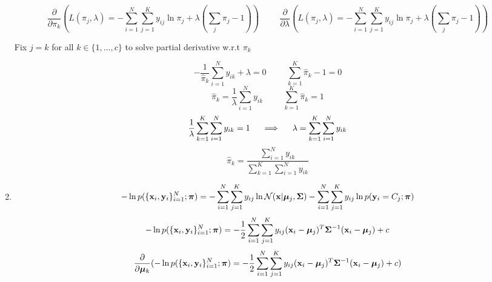 \documentclass[submit]{harvardml}
\begin{document}
\begin{enumerate}
        \begin{equation*}
           \frac{\partial}{\partial\pi_{k}}(L(\pi_{j}, \lambda) = -\sum_{i=1}^{N} \sum_{j=1}^{K} y_{ij} \ln \pi_{j} + \lambda(\sum_j\pi_j - 1)) \hspace{1cm} \frac{\partial}{\partial\lambda} (L(\pi_{j}, \lambda) = -\sum_{i=1}^{N} \sum_{j=1}^{K} y_{ij} \ln \pi_{j} + \lambda(\sum_j\pi_j - 1))
        \end{equation*}
        \begin{center}
            Fix $j = k$ for all $k \in \{1, \ldots, c\}$ to solve partial derivative w.r.t $\pi_k$
        \end{center}
        \begin{equation*}
          -\frac{1}{\hat\pi_{k}}\sum_{i=1}^{N} y_{ik} + \lambda = 0 \hspace{1cm} \sum_{k=1}^{K}\hat\pi_k - 1 = 0
        \end{equation*}
        \begin{equation*}
          \hat\pi_{k} = \frac{1}{\lambda}\sum_{i=1}^{N} y_{ik}  \hspace{1cm} \sum_{k=1}^{K}\hat\pi_k = 1
        \end{equation*}
        \begin{equation*}
          \frac{1}{\lambda} \sum_{k=1}^{K} \sum_{i=1}^{N} y_{ik} = 1 \hspace{.5cm}\Longrightarrow\hspace{.5cm} \lambda = \sum_{k=1}^{K} \sum_{i=1}^{N} y_{ik}
        \end{equation*}
        \begin{equation*}
          \hat\pi_{k} = \frac{\sum_{i=1}^{N} y_{ik}}{\sum_{k=1}^{K} \sum_{i=1}^{N} y_{ik}}
        \end{equation*}
        \item
        \begin{equation*}
            -\ln p(\{\mathbf{x}_{i}, \mathbf{y}_{i}\}_{i=1}^{N}; \boldsymbol{\pi}) = -\sum_{i=1}^{N} \sum_{j=1}^{K} y_{ij} \ln \mathcal{N}(\mathbf{x} |  \boldsymbol{\mu}_j, \mathbf{\Sigma}) -\sum_{i=1}^{N} \sum_{j=1}^{K} y_{ij}\ln  p(\mathbf{y}_{i} = C_j; \boldsymbol{\pi})
        \end{equation*}
        \begin{equation*}
            -\ln p(\{\mathbf{x}_{i}, \mathbf{y}_{i}\}_{i=1}^{N}; \boldsymbol{\pi}) = -\frac{1}{2}\sum_{i=1}^{N} \sum_{j=1}^{K} y_{ij} (\mathbf{x}_i - \boldsymbol{\mu}_j)^T \mathbf{\Sigma}^{-1}(\mathbf{x}_i - \boldsymbol{\mu}_j) + c
        \end{equation*}
        \begin{equation*}
            \frac{\partial}{\partial \bmu_k}(-\ln p(\{\boldx_{i}, \boldy_{i}\}_{i=1}^{N}; \bpi) = -\frac{1}{2}\sum_{i=1}^{N} \sum_{j=1}^{K} y_{ij} (\boldx_i - \bmu_j)^T \bSigma^{-1}(\boldx_i - \bmu_j) + c)

\end{equation*}
\end{enumerate}
\end{document}
